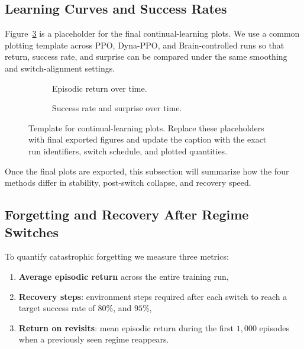 ﻿\documentclass[sigconf]{acmart}
\begin{document}
\subsection{Learning Curves and Success Rates}
Figure~\ref{fig:learning_curves} is a placeholder for the final continual-learning plots. We use a common plotting template across PPO, Dyna-PPO, and Brain-controlled runs so that return, success rate, and surprise can be compared under the same smoothing and switch-alignment settings.

\begin{figure}[t]
  \centering
  \begin{subfigure}{\linewidth}
    \centering
    \caption{Episodic return over time.}
    \label{fig:return_curve}
  \end{subfigure}
  \vspace{0.5em}
  \begin{subfigure}{\linewidth}
    \centering
    \caption{Success rate and surprise over time.}
    \label{fig:success_rates}
  \end{subfigure}
  \caption{Template for continual-learning plots. Replace these placeholders with final exported figures and update the caption with the exact run identifiers, switch schedule, and plotted quantities.}
  \label{fig:learning_curves}
\end{figure}

Once the final plots are exported, this subsection will summarize how the four methods differ in stability, post-switch collapse, and recovery speed.

\subsection{Forgetting and Recovery After Regime Switches}
To quantify catastrophic forgetting we measure three metrics:
\begin{enumerate}
  \item \textbf{Average episodic return} across the entire training run,
  \item \textbf{Recovery steps}: environment steps required after each switch to reach a target success rate of $80\%$, and $95\%$,
  \item \textbf{Return on revisits}: mean episodic return during the first $1{,}000$ episodes when a previously seen regime reappears.
\end{enumerate}
\end{document}
